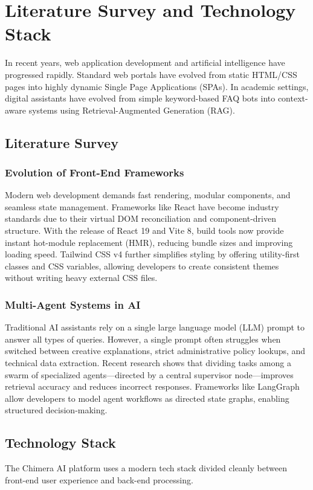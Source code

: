 \chapter{Literature Survey and Technology Stack}

In recent years, web application development and artificial intelligence have progressed rapidly. Standard web portals have evolved from static HTML/CSS pages into highly dynamic Single Page Applications (SPAs). In academic settings, digital assistants have evolved from simple keyword-based FAQ bots into context-aware systems using Retrieval-Augmented Generation (RAG).

\section{Literature Survey}

\subsection{Evolution of Front-End Frameworks}
Modern web development demands fast rendering, modular components, and seamless state management. Frameworks like React have become industry standards due to their virtual DOM reconciliation and component-driven structure. With the release of React 19 and Vite 8, build tools now provide instant hot-module replacement (HMR), reducing bundle sizes and improving loading speed. Tailwind CSS v4 further simplifies styling by offering utility-first classes and CSS variables, allowing developers to create consistent themes without writing heavy external CSS files.

\subsection{Multi-Agent Systems in AI}
Traditional AI assistants rely on a single large language model (LLM) prompt to answer all types of queries. However, a single prompt often struggles when switched between creative explanations, strict administrative policy lookups, and technical data extraction. Recent research shows that dividing tasks among a swarm of specialized agents---directed by a central supervisor node---improves retrieval accuracy and reduces incorrect responses. Frameworks like LangGraph allow developers to model agent workflows as directed state graphs, enabling structured decision-making.

\section{Technology Stack}
The Chimera AI platform uses a modern tech stack divided cleanly between front-end user experience and back-end processing.

